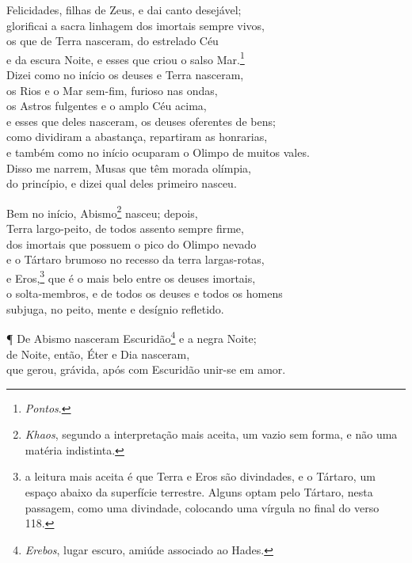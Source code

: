 \quad{}Felicidades, filhas de Zeus, e dai canto desejável;\\
glorificai a sacra linhagem dos imortais sempre vivos, \\
os que de Terra nasceram, do estrelado Céu\\
e da escura Noite, e esses que criou o salso Mar.\footnote{\emph{Pontos}.}\\
Dizei como no início os deuses e Terra nasceram,\\
os Rios e o Mar sem-fim, furioso nas ondas,\\
os Astros fulgentes e o amplo Céu acima, \\
e esses que deles nasceram, os deuses oferentes de bens;\\
como dividiram a abastança, repartiram as honrarias,\\
e também como no início ocuparam o Olimpo de muitos vales.\\
Disso me narrem, Musas que têm morada olímpia,\\
do princípio, e dizei qual deles primeiro nasceu. 

\quad{}Bem no início, Abismo\footnote{\emph{Khaos}, segundo a interpretação mais aceita, um vazio sem forma, e não uma matéria indistinta.} nasceu; depois,\\
Terra largo-peito, de todos assento sempre firme,\\
dos imortais que possuem o pico do Olimpo nevado\\
e o Tártaro brumoso no recesso da terra largas-rotas,\\
e Eros,\footnote{a leitura mais aceita é que Terra e Eros são divindades, e o
Tártaro, um espaço abaixo da superfície terrestre. Alguns optam pelo
Tártaro, nesta passagem, como uma divindade, colocando uma vírgula no
final do verso 118.} que é o mais belo entre os deuses imortais,\\
o solta-membros, e de todos os deuses e todos os homens\\
subjuga, no peito, mente e desígnio refletido.

¶ De Abismo nasceram Escuridão\footnote{\emph{Erebos}, lugar escuro, amiúde associado ao Hades.} e a negra Noite;\\
de Noite, então, Éter e Dia nasceram,\\
que gerou, grávida, após com Escuridão unir-se em amor.

